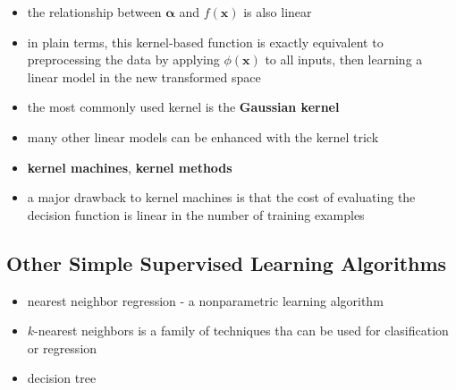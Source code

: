 \documentclass[11pt, twocolumn]{report}
\begin{document}
\begin{itemize}
  \item the relationship between $\bm{\alpha}$ and $f(\bm{x})$ is also linear
  \item in plain terms, this kernel-based function is exactly equivalent to
    preprocessing the data by applying $\phi(\bm{x})$ to all inputs, then
    learning a linear model in the new transformed space
  \item the most commonly used kernel is the \textbf{Gaussian kernel}
  \item many other linear models can be enhanced with the kernel trick
  \item \textbf{kernel machines}, \textbf{kernel methods}
  \item a major drawback to kernel machines is that the cost of evaluating the
    decision function is linear in the number of training examples
\end{itemize}

\subsection{Other Simple Supervised Learning Algorithms}
\begin{itemize}
  \item nearest neighbor regression - a nonparametric learning algorithm
  \item $k$-nearest neighbors is a family of techniques tha can be used for
    clasification or regression
  \item decision tree
\end{itemize}
\end{document}
